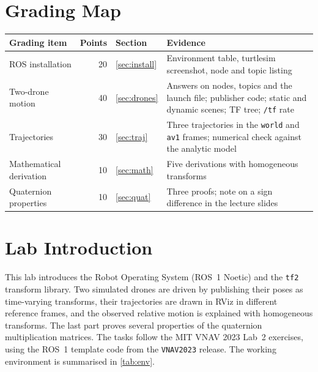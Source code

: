 \documentclass[a4paper]{tufte-handout}
\begin{document}
\maketitle

\begin{abstract}
ROS~1 Noetic was installed in Ubuntu~20.04 under WSL~2 and verified with
turtlesim.
In the two-drone scenario, AV1 flies a circle and AV2 an arc of a parabola;
their poses were published as \texttt{tf2} transforms, and the relative
transform was looked up to plot three trajectories in RViz.
Seen from AV1, AV2 moves on an ellipse in the plane $z - 2y = 1$ with
semi-axes $\tfrac12$ and $\tfrac{\sqrt5}{2}$; this was derived with
homogeneous transforms and confirmed on 300 tf samples to round-off level.
Three properties of the quaternion multiplication matrices were proved.
\end{abstract}

\section*{Grading Map}

\begin{table}[h]
\small
\begin{tabularx}{\linewidth}{@{}l r l X@{}}
\toprule
Grading item & Points & Section & Evidence \\
\midrule
ROS installation & 20 & \cref{sec:install} & Environment table, turtlesim screenshot, node and topic listing \\
Two-drone motion & 40 & \cref{sec:drones} & Answers on nodes, topics and the launch file; publisher code; static and dynamic scenes; TF tree; \texttt{/tf} rate \\
Trajectories & 30 & \cref{sec:traj} & Three trajectories in the \texttt{world} and \texttt{av1} frames; numerical check against the analytic model \\
Mathematical derivation & 10 & \cref{sec:math} & Five derivations with homogeneous transforms \\
Quaternion properties & 10 & \cref{sec:quat} & Three proofs; note on a sign difference in the lecture slides \\
\bottomrule
\end{tabularx}
\end{table}

\section{Lab Introduction}\label{sec:intro}
This lab introduces the Robot Operating System (ROS~1 Noetic) and the \texttt{tf2}
transform library.
Two simulated drones are driven by publishing their poses as time-varying
transforms, their trajectories are drawn in RViz in different reference frames,
and the observed relative motion is explained with homogeneous transforms.
The last part proves several properties of the quaternion multiplication
matrices.
The tasks follow the MIT VNAV 2023 Lab~2 exercises,\cite{vnav2023lab2} using the
ROS~1 template code from the \texttt{VNAV2023} release.\cite{vnavlabs}
The working environment is summarised in \cref{tab:env}.
\end{document}
